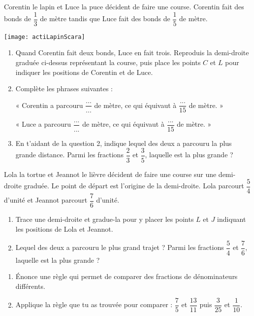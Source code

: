 \begin{activite}

\begin{partie}
Corentin le lapin et Luce la puce décident de faire une course. Corentin fait des bonds de $\dfrac{1}{3}$ de mètre tandis que Luce fait des bonds de $\dfrac{1}{5}$ de mètre. 

\begin{center}
    \texttt{[image: actiLapinScara]}
\end{center}

    \begin{enumerate}
        \item Quand Corentin fait deux bonds, Luce en fait trois. Reproduis la demi-droite graduée ci-dessus représentant la course, puis place les points $C$ et $L$ pour indiquer les positions de Corentin et de Luce.
        \item Complète les phrases suivantes :
        
« Corentin a parcouru $\dfrac{...}{...}$ de mètre, ce qui équivaut à $\dfrac{...}{15}$ de mètre. »

« Luce a parcouru $\dfrac{...}{...}$ de mètre, ce qui équivaut à $\dfrac{...}{15}$ de mètre. »

        \item En t'aidant de la question 2, indique lequel des deux a parcouru la plus grande distance. Parmi les fractions $\dfrac{2}{3}$ et $\dfrac{3}{5}$, laquelle est la plus grande ?
    \end{enumerate}
\end{partie}

\begin{partie}
Lola la tortue et Jeannot le lièvre décident de faire une course sur une demi-droite graduée. Le point de départ est l'origine de la demi-droite. Lola parcourt $\dfrac{5}{4}$ d'unité et Jeannot parcourt $\dfrac{7}{6}$ d'unité.
    \begin{enumerate}
        \item Trace une demi-droite et gradue-la pour y placer les points $L$ et $J$ indiquant les positions de Lola et Jeannot.
        \item Lequel des deux a parcouru le plus grand trajet ? Parmi les fractions $\dfrac{5}{4}$ et $\dfrac{7}{6}$, laquelle est la plus grande ?
    \end{enumerate}
\end{partie}


\begin{partie}[Bilan]
\begin{enumerate}
    \item Énonce une règle qui permet de comparer des fractions de dénominateurs différents.
    \item Applique la règle que tu as trouvée pour comparer : $\dfrac{7}{5}$ et $\dfrac{13}{11}$ puis $\dfrac{3}{25}$ et $\dfrac{1}{10}$.
\end{enumerate}
\end{partie}

\end{activite}


